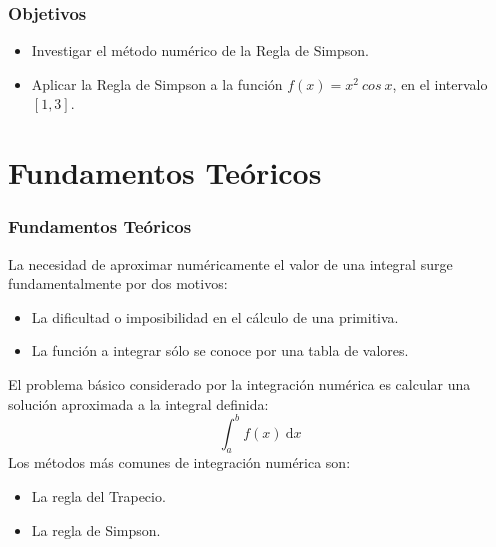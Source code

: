 \documentclass{beamer}
\begin{document}
\begin{frame}

\frametitle{Objetivos}

\begin{block}{}
  \begin{itemize}
  \item
   Investigar el método numérico de la Regla de Simpson. 
  \item
   Aplicar la Regla de Simpson a la función $f(x)=x^{2}\ cos\ x$, en el intervalo $[1,3]$.

  \end{itemize}

\end{block}

\end{frame}

\section{Fundamentos Teóricos}

\begin{frame}
  \frametitle{Fundamentos Teóricos}
  La necesidad de aproximar numéricamente el valor de una integral surge fundamentalmente por dos motivos:
  \begin{itemize}
    \item La dificultad o imposibilidad en el cálculo de una primitiva.
    \item La función a integrar sólo se conoce por una tabla de valores.
  \end{itemize}
  
  El problema básico considerado por la integración numérica es calcular una solución
  aproximada a la integral definida:
  \[\int_{a}^{b} f(x)\ \text{d}x \]
  Los métodos más comunes de integración numérica son:
  \begin{itemize}
    \item La regla del Trapecio.
    \item La regla de Simpson.
  \end{itemize}
  
\end{frame}
\end{document}
